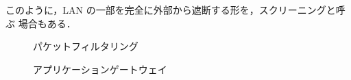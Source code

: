 このように，LAN の一部を完全に外部から遮断する形を，スクリーニングと呼ぶ
場合もある．

\begin{figure}[h]
 \begin{center}
  \caption{パケットフィルタリング}
  \label{fig:26:pf}
 \end{center}
\end{figure}

\begin{figure}[h]
  \begin{center}
  \caption{アプリケーションゲートウェイ}
  \label{fig:26:ag}
 \end{center}
\end{figure}

